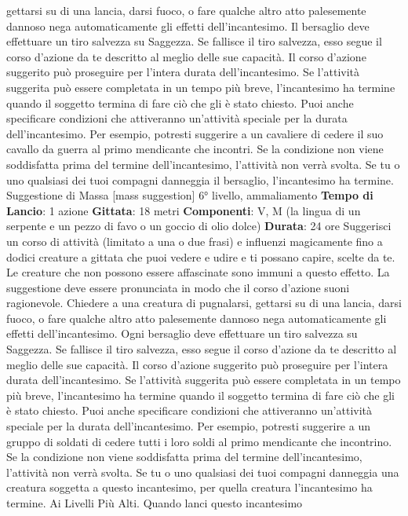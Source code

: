 \begin{multicols}{2}
gettarsi su di una lancia, darsi fuoco, o fare qualche
altro atto palesemente dannoso nega automaticamente
gli effetti dell’incantesimo.
Il bersaglio deve effettuare un tiro salvezza su
Saggezza. Se fallisce il tiro salvezza, esso segue il
corso d’azione da te descritto al meglio delle sue
capacità. Il corso d’azione suggerito può proseguire per
l’intera durata dell’incantesimo. Se l’attività suggerita
può essere completata in un tempo più breve,
l’incantesimo ha termine quando il soggetto termina di
fare ciò che gli è stato chiesto.
Puoi anche specificare condizioni che attiveranno
un’attività speciale per la durata dell’incantesimo. Per
esempio, potresti suggerire a un cavaliere di cedere il
suo cavallo da guerra al primo mendicante che incontri.
Se la condizione non viene soddisfatta prima del
termine dell’incantesimo, l’attività non verrà svolta.
Se tu o uno qualsiasi dei tuoi compagni danneggia il
bersaglio, l’incantesimo ha termine.
Suggestione di Massa
[mass suggestion]
6° livello, ammaliamento
\textbf{Tempo di Lancio}: 1 azione
\textbf{Gittata}: 18 metri
\textbf{Componenti}: V, M (la lingua di un serpente e un pezzo
di favo o un goccio di olio dolce)
\textbf{Durata}: 24 ore
Suggerisci un corso di attività (limitato a una o due
frasi) e influenzi magicamente fino a dodici creature a
gittata che puoi vedere e udire e ti possano capire,
scelte da te. Le creature che non possono essere
affascinate sono immuni a questo effetto. La
suggestione deve essere pronunciata in modo che il
corso d’azione suoni ragionevole. Chiedere a una
creatura di pugnalarsi, gettarsi su di una lancia, darsi
fuoco, o fare qualche altro atto palesemente dannoso
nega automaticamente gli effetti dell’incantesimo.
Ogni bersaglio deve effettuare un tiro salvezza su
Saggezza. Se fallisce il tiro salvezza, esso segue il
corso d’azione da te descritto al meglio delle sue
capacità. Il corso d’azione suggerito può proseguire per
l’intera durata dell’incantesimo. Se l’attività suggerita
può essere completata in un tempo più breve,
l’incantesimo ha termine quando il soggetto termina di
fare ciò che gli è stato chiesto.
Puoi anche specificare condizioni che attiveranno
un’attività speciale per la durata dell’incantesimo. Per
esempio, potresti suggerire a un gruppo di soldati di
cedere tutti i loro soldi al primo mendicante che
incontrino. Se la condizione non viene soddisfatta prima
del termine dell’incantesimo, l’attività non verrà svolta.
Se tu o uno qualsiasi dei tuoi compagni danneggia una
creatura soggetta a questo incantesimo, per quella
creatura l’incantesimo ha termine.
Ai Livelli Più Alti. Quando lanci questo incantesimo

\end{multicols}
